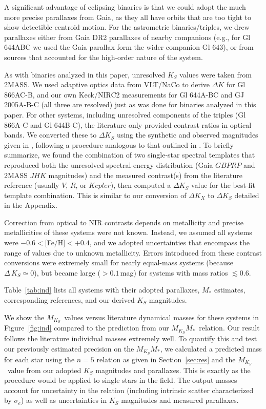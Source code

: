 \documentclass[twocolumn]{aastex62}
\newcommand{\mks}{$M_{K_S}$}
\newcommand{\mmk}{$M_{K_S}$\textendash$M_*$}
\begin{document}
A significant advantage of eclipsing binaries is that we could adopt the much more precise parallaxes from Gaia, as they all have orbits that are too tight to show detectible centroid motion. For the astrometric binaries/triples, we drew parallaxes either from Gaia DR2 parallaxes of nearby companions (e.g., for Gl 644ABC we used the Gaia parallax form the wider companion Gl 643), or from sources that accounted for the high-order nature of the system. 

As with binaries analyzed in this paper, unresolved $K_S$ values were taken from 2MASS. We used adaptive optics data from VLT/NaCo to derive $\Delta K$ for Gl 866AC-B, and our own Keck/NIRC2 measurements for Gl 644A-BC and GJ 2005A-B-C (all three are resolved) just as was done for binaries analyzed in this paper. For other systems, including unresolved components of the triples (Gl 866A-C and Gl 644B-C), the literature only provided contrast ratios in optical bands. We converted these to $\Delta K_S$ using the synthetic and observed magnitudes given in \citet{Mann2015b}, following a procedure analogous to that outlined in \citep{2017ApJ...845...72K}. To briefly summarize, we found the combination of two single-star spectral templates that reproduced both the unresolved spectral-energy distribution (Gaia $GBPRP$ and 2MASS $JHK$ magnitudes) and the measured contrast(s) from the literature reference (usually $V$, $R$, or $Kepler$), then computed a $\Delta K_S$ value for the best-fit template combination. This is similar to our conversion of $\Delta K_X$ to $\Delta K_S$ detailed in the Appendix. 

Correction from optical to NIR contrasts depends on metallicity \citep[e.g., ][]{Schlaufman2010} and precise metallicities of these systems were not known. Instead, we assumed all systems were $-0.6<$[Fe/H]$<+0.4$, and we adopted uncertainties that encompass the range of values due to unknown metallicity. Errors introduced from these contrast conversions were extremely small for nearly equal-mass systems (because $\Delta\,K_S\simeq0$), but became large ($>0.1$\,mag) for systems with mass ratios $\lesssim$0.6. 

Table~\ref{tab:ind} lists all systems with their adopted parallaxes, $M_*$ estimates, corresponding references, and our derived $K_S$ magnitudes.

We show the \mks\ values versus literature dynamical masses for these systems in Figure~\ref{fig:ind} compared to the prediction from our \mmk\ relation. Our result follows the literature individual masses extremely well. To quantify this and test our previously estimated precision on the \mmk, we calculated a predicted mass for each star using the $n=5$ relation as given in Section~\ref{sec:res} and the \mks\ value from our adopted $K_S$ magnitudes and parallaxes. This is exactly as the procedure would be applied to single stars in the field. The output masses account for uncertainty in the relation (including intrinsic scatter characterized by $\sigma_e$) as well as uncertainties in $K_S$ magnitudes and measured parallaxes. 
\end{document}
